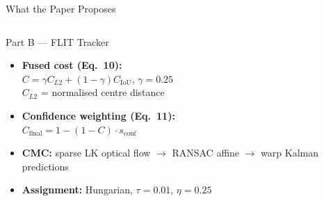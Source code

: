 \documentclass[aspectratio=169, 10pt]{beamer}
\begin{document}
\begin{frame}{What the Paper Proposes}
\begin{columns}[T]
\begin{block}{Part B — FLIT Tracker}
\begin{itemize}
        \vspace{0.4em}
        \item \textbf{Fused cost (Eq.~10):}\\
          $C = \gamma C_{L2} + (1{-}\gamma)C_{\text{IoU}}$,\; $\gamma=0.25$\\
          $C_{L2}$ = normalised centre distance

        \vspace{0.4em}
        \item \textbf{Confidence weighting (Eq.~11):}\\
          $C_{\text{final}} = 1 - (1-C) \cdot s_{\text{conf}}$

        \vspace{0.4em}
        \item \textbf{CMC:} sparse LK optical flow $\to$ RANSAC affine $\to$ warp Kalman predictions

        \vspace{0.4em}
        \item \textbf{Assignment:} Hungarian,
          $\tau{=}0.01$, $\eta{=}0.25$
      \end{itemize}
    \end{block}

  \end{columns}
\end{frame}
\end{document}
